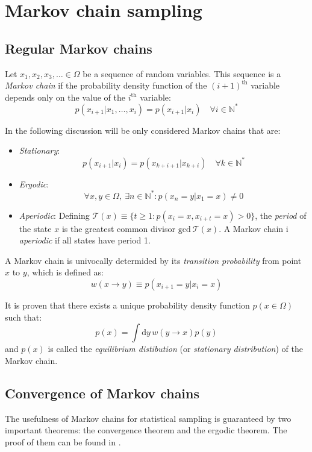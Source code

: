 \section{Markov chain sampling}

\subsection*{Regular Markov chains}
Let $x_1, x_2, x_3, \ldots \in \Omega$ be a sequence of random variables.
This sequence is a \emph{Markov chain} if the probability density function of the $(i+1)^\mathrm{th}$
variable depends only on the value of the $i^\mathrm{th}$ variable:
\[
    p(x_{i+1}|x_1, \ldots, x_i) = p(x_{i+1}|x_i) \quad \forall i\in\mathbb N^*
\]

In the following discussion will be only considered Markov chains that are:
\begin{itemize}
    \item \emph{Stationary}:
        \[
            p(x_{i+1}|x_i) = p(x_{k+i+1}|x_{k+i}) \quad \forall k\in\mathbb N^*
        \]
    \item \emph{Ergodic}:
        \[
            \forall x,y \in \Omega,\ \exists n\in\mathbb N^* : p(x_n=y|x_1=x) \neq 0
        \]
    \item \emph{Aperiodic}:
        Defining $\mathcal T(x) \equiv \{t\geq1:p(x_i=x,x_{i+t}=x)>0\}$,
        the \emph{period} of the state $x$ is the greatest common divisor $\mathrm{gcd}\ \mathcal T(x)$.
        A Markov chain i \emph{aperiodic} if all states have period 1.
\end{itemize}

A Markov chain is univocally determided by its \emph{transition probability} from point $x$ to $y$, which is defined as:
\begin{equation}\label{eq:transition}
    w(x \to y) \equiv p(x_{i+1}=y|x_i=x)
\end{equation}

It is proven \cite{mc-mt} that there exists a unique probability density function $p(x\in\Omega)$
such that:
\begin{equation}\label{eq:equilibrium}
	p(x) = \int\mathrm dy\,w(y \to x)p(y)
\end{equation}
and $p(x)$ is called the \emph{equilibrium distibution} (or \emph{stationary distribution}) of the Markov chain.

\subsection*{Convergence of Markov chains}
The usefulness of Markov chains for statistical sampling is guaranteed by two important theorems:
the convergence theorem and the ergodic theorem. The proof of them can be found in \cite{mc-mt}.


